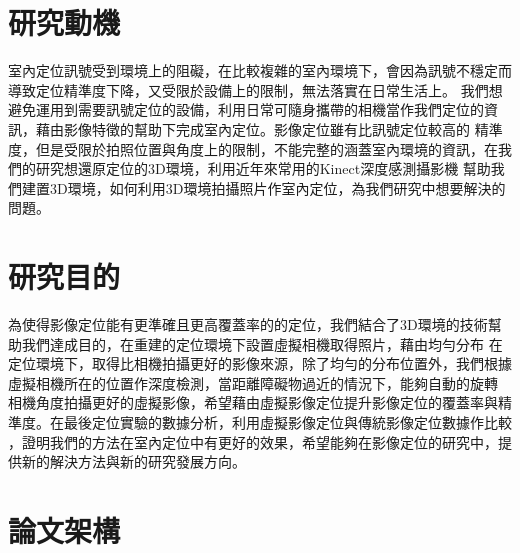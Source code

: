 %
%
%	
%
\section{研究動機}

	室內定位訊號受到環境上的阻礙，在比較複雜的室內環境下，會因為訊號不穩定而導致定位精準度下降，又受限於設備上的限制，無法落實在日常生活上。
我們想避免運用到需要訊號定位的設備，利用日常可隨身攜帶的相機當作我們定位的資訊，藉由影像特徵的幫助下完成室內定位。影像定位雖有比訊號定位較高的
精準度，但是受限於拍照位置與角度上的限制，不能完整的涵蓋室內環境的資訊，在我們的研究想還原定位的3D環境，利用近年來常用的Kinect深度感測攝影機
幫助我們建置3D環境，如何利用3D環境拍攝照片作室內定位，為我們研究中想要解決的問題。
	
\section{研究目的}
	
	為使得影像定位能有更準確且更高覆蓋率的的定位，我們結合了3D環境的技術幫助我們達成目的，在重建的定位環境下設置虛擬相機取得照片，藉由均勻分布
在定位環境下，取得比相機拍攝更好的影像來源，除了均勻的分布位置外，我們根據虛擬相機所在的位置作深度檢測，當距離障礙物過近的情況下，能夠自動的旋轉
相機角度拍攝更好的虛擬影像，希望藉由虛擬影像定位提升影像定位的覆蓋率與精準度。在最後定位實驗的數據分析，利用虛擬影像定位與傳統影像定位數據作比較
，證明我們的方法在室內定位中有更好的效果，希望能夠在影像定位的研究中，提供新的解決方法與新的研究發展方向。

\section{論文架構}